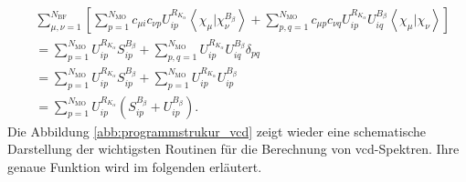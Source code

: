 	\begin{equation}\label{eq:term3+4}
	\begin{aligned}
	&\sum_{\mu,\nu=1}^{N_{\text{BF}}}\left[\sum_{p=1}^{N_{\text{MO}}}c_{\mu i}c_{\nu p}U_{ip}^{R_{K_\alpha}}\left\langle\chi_\mu\vert\chi_\nu^{B_{\beta}}\right\rangle+\sum_{p,q=1}^{N_{\text{MO}}}c_{\mu p}c_{\nu q}U_{ip}^{R_{K_\alpha}}U_{iq}^{B_\beta}\left\langle\chi_\mu\vert\chi_\nu\right\rangle\right]\\
	&=\sum_{p=1}^{N_{\text{MO}}}U_{ip}^{R_{K_\alpha}}S_{ip}^{B_\beta}+\sum_{p,q=1}^{N_{\text{MO}}}U_{ip}^{R_{K_\alpha}}U_{iq}^{B_\beta}\delta_{pq}\\
	&=\sum_{p=1}^{N_{\text{MO}}}U_{ip}^{R_{K_\alpha}}S_{ip}^{B_\beta}+\sum_{p=1}^{N_{\text{MO}}}U_{ip}^{R_{K_\alpha}}U_{ip}^{B_\beta}\\
	&=\sum_{p=1}^{N_{\text{MO}}}U_{ip}^{R_{K_\alpha}}\left(S_{ip}^{B_\beta}+U_{ip}^{B_\beta}\right).
	\end{aligned}
	\end{equation}
	Die Abbildung \ref{abb:programmstrukur_vcd} zeigt wieder eine schematische Darstellung der wichtigsten Routinen für die Berechnung von \ac{vcd}-Spektren. Ihre genaue Funktion wird im folgenden erläutert. 
